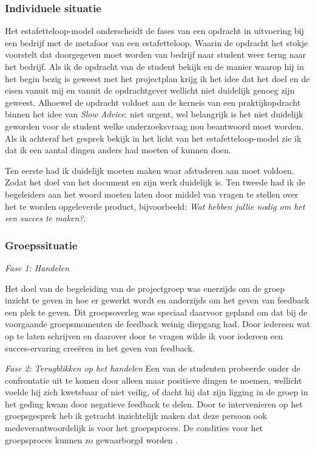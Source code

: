 \subsubsection{Individuele situatie}
Het estafetteloop-model onderscheidt de fases van een opdracht in uitvoering bij een bedrijf met de metafoor van een estafetteloop. Waarin de opdracht het stokje voorstelt dat doorgegeven moet worden van bedrijf naar student weer terug naar het bedrijf. Als ik de opdracht van de student bekijk en de manier waarop hij in het begin bezig is geweest met het projectplan krijg ik het idee dat het doel en de eisen vanuit mij en vanuit de opdrachtgever wellicht niet duidelijk genoeg zijn geweest. 
Alhoewel de opdracht voldoet aan de kerneis van een praktijkopdracht binnen het idee van \textit{Slow Advice}: niet urgent, wel belangrijk \cite{methorstslow} is het niet duidelijk geworden voor de student welke onderzoeksvraag nou beantwoord moet worden. Als ik achteraf het gesprek bekijk in het licht van het estafetteloop-model zie ik dat ik een aantal dingen anders had moeten of kunnen doen.

Ten eerste had ik duidelijk moeten maken waar afstuderen aan moet voldoen. Zodat het doel van het document en zijn werk duidelijk is.
Ten tweede had ik de begeleiders aan het woord moeten laten door middel van vragen te stellen over het te worden opgeleverde product, bijvoorbeeld: \textit{Wat hebben jullie nodig om het een succes te maken?}. 

\subsubsection{Groepssituatie}
\emph{Fase 1: Handelen}

Het doel van de begeleiding van de projectgroep was enerzijds om de groep inzicht te geven in hoe er gewerkt wordt en anderzijds om het geven van feedback een plek te geven. Dit groepsoverleg was speciaal daarvoor gepland om dat bij de voorgaande groepsmomenten de feedback weinig diepgang had. Door iedereen wat op te laten schrijven en daarover door te vragen wilde ik voor iedereen een succes-ervaring creeëren in het geven van feedback.

\noindent \emph{Fase 2: Terugblikken op het handelen}
Een van de studenten probeerde onder de confrontatie uit te komen door alleen maar positieve dingen te noemen, wellicht voelde hij zich kwetsbaar of niet veilig, of dacht hij dat zijn ligging in de groep in het geding kwam door negatieve feedback te delen.
Door te intervenieren op het groepsgesprek heb ik getracht inzichtelijk maken dat deze persoon ook medeverantwoordelijk is voor het groepsproces. De condities voor het groepsproces kunnen zo gewaarborgd worden \cite{baert2009interventies}.

